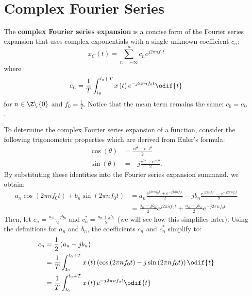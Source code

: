\documentclass{article}
\begin{document}
\section{Complex Fourier Series}
\begin{definition}
    The \textbf{complex Fourier series expansion} is a concise form of
    the Fourier series expansion that uses complex exponentials with a
    single unknown coefficient \(c_n\):
    \begin{equation*}
        x_C\left( t \right) = \sum_{n = -\infty}^\infty c_n e^{j 2\pi n f_0 t}
    \end{equation*}
    where
    \begin{equation*}
        c_n = \frac{1}{T} \int_{t_0}^{t_0 + T} x\left( t \right) e^{-j 2\pi n f_0 t} \odif{t}
    \end{equation*}
    for \(n \in \Z\backslash \left\{ 0 \right\}\) and \(f_0 = \frac{1}{T}\).
    Notice that the mean term remains the same: \(c_0 = a_0\).
\end{definition}
To determine the complex Fourier series expansion of a function,
consider the following trigonometric properties which are derived from
Euler's formula:
\begin{align*}
    \cos{\left( \theta \right)} & = \frac{e^{j \theta} + e^{-j \theta}}{2}     \\
    \sin{\left( \theta \right)} & = -j \frac{e^{j \theta} - e^{-j \theta}}{2}.
\end{align*}
By substituting these identities into the Fourier series expansion summand, we obtain:
\begin{align*}
    a_n \cos{\left( 2\pi n f_0 t \right)} + b_n \sin{\left( 2\pi n f_0 t \right)} & = a_n \frac{e^{j 2\pi n f_0 t} + e^{-j 2\pi n f_0 t}}{2} -j b_n \frac{e^{j 2\pi n f_0 t} - e^{-j 2\pi n f_0 t}}{2} \\
                                                                                  & = \frac{a_n - j b_n}{2} e^{j 2\pi n f_0 t} + \frac{a_n + j b_n}{2} e^{-j 2\pi n f_0 t}
\end{align*}
Then, let \(c_n = \frac{a_n - j b_n}{2}\) and \(c_n^\ast = \frac{a_n + j b_n}{2}\)
(we will see how this simplifies later). Using the definitions for \(a_n\)
and \(b_n\), the coefficients \(c_n\) and \(c_n^\ast\) simplify to:
\begin{align*}
    c_n & = \frac{1}{2} \left( a_n - j b_n \right)                                                                                                            \\
        & = \frac{1}{T} \int_{t_0}^{t_0 + T} x\left( t \right) \left( \cos{\left( 2\pi n f_0 t \right)} -j \sin{\left( 2\pi n f_0 t \right)} \right) \odif{t} \\
        & = \frac{1}{T} \int_{t_0}^{t_0 + T} x\left( t \right) e^{-j 2\pi n f_0 t} \odif{t}
\end{align*}
\end{document}
